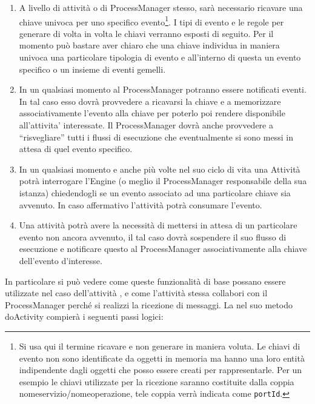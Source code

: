 \begin{enumerate}
  \item A livello di attività o di ProcessManager stesso,
  sarà necessario ricavare una chiave univoca per uno specifico 
  evento\footnote{Si usa qui il termine ricavare e non generare in maniera
  voluta. Le chiavi di evento non sono identificate da oggetti in memoria ma
  hanno una loro entità indipendente
  dagli oggetti che posso essere creati per rappresentarle. Per un esempio le
  chiavi utilizzate per la ricezione saranno costituite dalla coppia
  nomeservizio/nomeoperazione, tele coppia verrà indicata come
  \texttt{portId}.}. I tipi di evento e le regole per generare di volta in
  volta le chiavi verranno esposti di seguito. Per il momento può bastare aver
  chiaro che una chiave individua in maniera univoca una particolare tipologia di evento e all'interno di questa un evento specifico o un insieme
  di eventi gemelli.
  
  \item In un qualsiasi momento al ProcessManager potranno essere notificati
  eventi. In tal caso esso dovrà provvedere a ricavarsi la chiave e a
  memorizzare associativamente l'evento alla chiave per poterlo poi rendere
  disponibile all'attivita' interessate. Il ProcessManager dovrà anche
  provvedere a ``risvegliare'' tutti i flussi di esecuzione che
  eventualmente si sono messi in attesa di quel evento specifico.
   
  \item In un qualsiasi momento e anche più volte nel suo ciclo di vita una
  Attività potrà interrogare l'Engine (o meglio il ProcessManager responsabile
  della sua istanza) chiedendogli se un evento associato ad una particolare
  chiave sia avvenuto. In caso affermativo l'attività potrà consumare l'evento.

  \item Una attività potrà avere la necessità di mettersi in attesa di un
  particolare evento non ancora avvenuto, il tal caso dovrà sospendere il
  suo flusso di esecuzione e notificare questo al ProcessManager
  associativamente alla chiave dell'evento d'interesse. 
\end{enumerate}


In particolare si può vedere come queste funzionalità di base possano essere
utilizzate nel caso dell'attività , e come
l'attività stessa collabori con il ProcessManager perché si realizzi la
ricezione di messaggi. La  nel suo metodo doActivity
compierà i seguenti passi logici:

